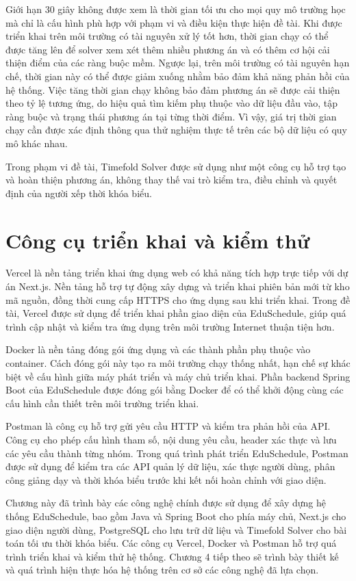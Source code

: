 \documentclass[../DoAn.tex]{subfiles}
\begin{document}
Giới hạn 30 giây không được xem là thời gian tối ưu cho mọi quy mô trường học mà chỉ là cấu hình phù hợp với phạm vi và điều kiện thực hiện đề tài. Khi được triển khai trên môi trường có tài nguyên xử lý tốt hơn, thời gian chạy có thể được tăng lên để solver xem xét thêm nhiều phương án và có thêm cơ hội cải thiện điểm của các ràng buộc mềm. Ngược lại, trên môi trường có tài nguyên hạn chế, thời gian này có thể được giảm xuống nhằm bảo đảm khả năng phản hồi của hệ thống. Việc tăng thời gian chạy không bảo đảm phương án sẽ được cải thiện theo tỷ lệ tương ứng, do hiệu quả tìm kiếm phụ thuộc vào dữ liệu đầu vào, tập ràng buộc và trạng thái phương án tại từng thời điểm. Vì vậy, giá trị thời gian chạy cần được xác định thông qua thử nghiệm thực tế trên các bộ dữ liệu có quy mô khác nhau.

Trong phạm vi đề tài, Timefold Solver được sử dụng như một công cụ hỗ trợ tạo
và hoàn thiện phương án, không thay thế vai trò kiểm tra, điều chỉnh và quyết
định của người xếp thời khóa biểu.


\section{Công cụ triển khai và kiểm thử}
\label{section:3.2}

Vercel là nền tảng triển khai ứng dụng web có khả năng tích hợp trực tiếp với
dự án Next.js. Nền tảng hỗ trợ tự động xây dựng và triển khai phiên bản mới từ
kho mã nguồn, đồng thời cung cấp HTTPS cho ứng dụng sau khi triển khai. Trong
đề tài, Vercel được sử dụng để triển khai phần giao diện của EduSchedule, giúp
quá trình cập nhật và kiểm tra ứng dụng trên môi trường Internet thuận tiện hơn.

Docker là nền tảng đóng gói ứng dụng và các thành phần phụ thuộc vào
container. Cách đóng gói này tạo ra môi trường chạy thống nhất, hạn chế sự khác
biệt về cấu hình giữa máy phát triển và máy chủ triển khai. Phần backend Spring
Boot của EduSchedule được đóng gói bằng Docker để có thể khởi động cùng các
cấu hình cần thiết trên môi trường triển khai.

Postman là công cụ hỗ trợ gửi yêu cầu HTTP và kiểm tra phản hồi của API. Công
cụ cho phép cấu hình tham số, nội dung yêu cầu, header xác thực và lưu các yêu
cầu thành từng nhóm. Trong quá trình phát triển EduSchedule, Postman được sử
dụng để kiểm tra các API quản lý dữ liệu, xác thực người dùng, phân công giảng
dạy và thời khóa biểu trước khi kết nối hoàn chỉnh với giao diện.

Chương này đã trình bày các công nghệ chính được sử dụng để xây dựng hệ
thống EduSchedule, bao gồm Java và Spring Boot cho phía máy chủ, Next.js cho
giao diện người dùng, PostgreSQL cho lưu trữ dữ liệu và Timefold Solver cho bài
toán tối ưu thời khóa biểu. Các công cụ Vercel, Docker và Postman hỗ trợ quá
trình triển khai và kiểm thử hệ thống. Chương 4 tiếp theo sẽ trình bày thiết kế
và quá trình hiện thực hóa hệ thống trên cơ sở các công nghệ đã lựa chọn.
\end{document}
